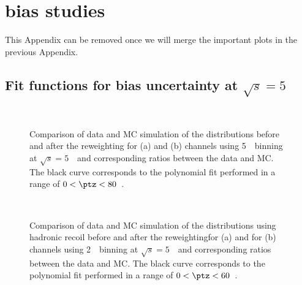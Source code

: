 \section{\ptz bias studies}
\label{sec:zpt_bias}

 {\color{blue} This Appendix can be removed once we will merge the important plots in the previous Appendix.}


\subsection{Fit functions for \ptz bias uncertainty at $\sqrt{s} = 5$~\TeV\ }
\begin{figure}[h]
\centering
{}
\\
\caption{Comparison of data and MC simulation of the \ptz distributions before and after the reweighting for \Zee (a) and \Zmm (b) channels using 5~\GeV\ binning at $\sqrt{s} = 5$~\TeV\ and corresponding ratios between the data and MC. The black curve corresponds to the polynomial fit performed in a range of $0<\ptz<80$~\GeV. }
\label{fig:fits_pt_5_5GeV}
\end{figure}
\begin{figure}[h]
\centering
{}
\\
\caption{Comparison of data and MC simulation of the \ptz distributions using hadronic recoil before and after the reweightingfor \Zee (a) and for \Zmm (b) channels using 2~\GeV\ binning at $\sqrt{s} = 5$~\TeV\ and corresponding ratios between the data and MC. The black curve corresponds to the polynomial fit performed in a range of $0<\ptz<60$~\GeV. }
\label{fig:fits_ut_5_5GeV}
\end{figure}


